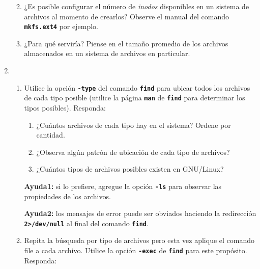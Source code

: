 \documentclass[12pt]{article}
\newcommand{\code}[1]{\textbf{\tt #1}}
\begin{document}
\begin{enumerate}
\begin{enumerate}
\begin{enumerate}
            \end{enumerate}

        \item   ¿Es posible configurar el número de \emph{inodos} disponibles
            en un sistema de archivos al momento de crearlos? Observe el
            manual del comando \code{mkfs.ext4} por ejemplo.

        \item   ¿Para qué serviría? Piense en el tamaño promedio de los
            archivos almacenados en un sistema de archivos en particular.

        \end{enumerate}

    \item \begin{enumerate}

        \item   Utilice la opción \code{-type} del comando \code{find} para
            ubicar todos los archivos de cada tipo posible (utilice la página
            \code{man} de \code{find} para determinar los tipos posibles).
            Responda:

            \begin{enumerate}

                \item   ¿Cuántos archivos de cada tipo hay en el sistema?
                    Ordene por cantidad.

                \item   ¿Observa algún patrón de ubicación de cada tipo de
                    archivos?

                \item   ¿Cuántos tipos de archivos posibles existen en
                    GNU/Linux?

            \end{enumerate}

            \textbf{Ayuda1:} si lo prefiere, agregue la opción \code{-ls} para
            observar las propiedades de los archivos.

            \textbf{Ayuda2:} los mensajes de error puede ser obviados haciendo
            la redirección \code{2\textgreater/dev/null} al final del comando
            \code{find}.

        \item Repita la búsqueda por tipo de archivos pero esta vez aplique el
            comando file a cada archivo. Utilice la opción \code{-exec} de
            \code{find} para este propósito. Responda:


\end{enumerate}
\end{enumerate}
\end{document}
